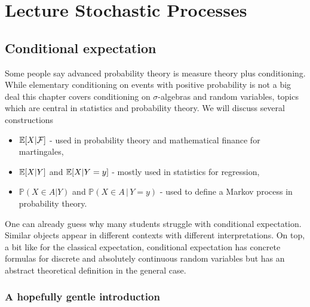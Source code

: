 \newpage 
\part{Lecture Stochastic Processes}
\newpage



\chapter{Conditional expectation}
	\marginpar{\textcolor{red}{Lecture 1}}


Some people say advanced probability theory is measure theory plus conditioning. While elementary conditioning on events with positive probability is not a big deal this chapter covers conditioning on $\sigma$-algebras and random variables, topics which are central in statistics and probability theory. We will discuss several constructions
\begin{itemize}
	\item $\mathbb{E}[X|\mathcal F]$ - used in probability theory and mathematical finance for martingales,
	\item $\mathbb{E}[X|Y]$ and $\mathbb{E}[X|Y=y]$ - mostly used in statistics for regression,
	\item $\mathbb P(X\in A| Y)$ and $\mathbb P(X\in A\,|\, Y=y)$ - used to define a Markov process in probability theory.
\end{itemize}
One can already guess why many students struggle with conditional expectation. Similar objects appear in different contexts with different interpretations. On top, a bit like for the classical expectation, conditional expectation has concrete formulas for discrete and absolutely continuous random variables but has an abstract theoretical definition in the general case. 


\section{A hopefully gentle introduction}\label{sec:gentle}

